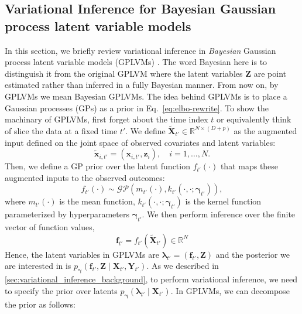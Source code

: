 \subsection{Variational Inference for Bayesian Gaussian process latent variable models}
In this section, we briefly review variational inference in \emph{Bayesian} Gaussian 
process latent variable models (GPLVMs) \cite{titsiasBayesianGaussianProcess2010}. The word Bayesian 
here is to distinguish it from the original GPLVM \cite{lawrenceGaussianProcessLatent2003} 
where the latent variables \( \mathbf{Z} \) are point estimated rather than 
inferred in a fully Bayesian manner. From now on, by GPLVMs we mean Bayesian GPLVMs. 
The idea behind GPLVMs is to place a Gaussian processes (GPs) as a 
prior in Eq.~\ref{eq:elbo-rewrite}. To show the machinary 
of GPLVMs, first forget about the time index \(t\) or 
equivalently think of slice the data at a fixed time \(t' \). We 
define \(\widetilde{\boldsymbol{X}}_{t'} \in \mathbb{R}^{N \times (D+p)}\) 
as the augmented input defined 
on the joint space of observed covariates and latent variables: 
\begin{equation}
    \widetilde{\boldsymbol{x}}_{i,t'} = (\boldsymbol{x}_{i,t'}, \mathbf{z}_i), \quad i=1,\dots,N.
\end{equation}
Then, we define a GP prior over the latent function \(f_{t'}(\cdot)\) that maps 
these augmented inputs to the observed outcomes:
\begin{equation}
    f_{t'}(\cdot) \sim \mathcal{GP}\left(m_{t'}(\cdot), k_{t'}(\cdot, \cdot; \boldsymbol{\gamma}_{t'})\right),
\end{equation}
where \(m_{t'}(\cdot)\) is the mean function, \(k_{t'}(\cdot, \cdot; \boldsymbol{\gamma}_{t'})\) is the kernel function 
parameterized by hyperparameters \(\boldsymbol{\gamma}_{t'}\). We then perform inference 
over the finite vector of function values,
\begin{equation}
\mathbf{f}_{t'} = f_{t'}(\widetilde{\mathbf{X}}_{t'}) \in \mathbb{R}^{N}
\end{equation}
Hence, the latent variables in GPLVMs are 
\( \boldsymbol{\lambda}_{t'} = (\mathbf{f}_{t'}, \mathbf{Z}) \) and 
the posterior we are interested in is \(p_{\boldsymbol{\gamma}}(\mathbf{f}_{t'}, \mathbf{Z} \mid \mathbf{X}_{t'}, \mathbf{Y}_{t'})\). 
As we described in \ref{sec:variational_inference_background}, to perform variational inference, 
we need to specify the prior over latents \(p_{\boldsymbol{\gamma}}(\boldsymbol{\lambda}_{t'}\mid \mathbf{X}_{t'})\). In GPLVMs,
we can decompose the prior as follows: 
